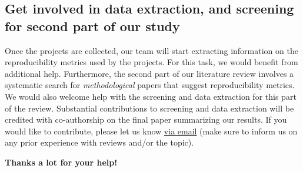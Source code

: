 \documentclass[a4paper,10.5pt]{report}
\begin{document}
\subsection*{Get involved in data extraction, and screening for second part of our study}
Once the projects are collected, our team will start extracting information on the reproducibility metrics used by the projects. For this task, we would benefit from additional help. Furthermore, the second part of our literature review involves a systematic search for \textit{methodological} papers that suggest reproducibility metrics. We would also welcome help with the screening and data extraction for this part of the review. Substantial contributions to screening and data extraction will be credited with co-authorship on the final paper summarizing our results. If you would like to contribute, please let us know \href{mailto:rachel.heyard@uzh.ch}{via email} (make sure to inform us on any prior experience with reviews and/or the topic).


\begin{center}
\textbf{\Large \textcolor{iRISEblue}{Thanks a lot for your help!}}
\end{center}
\end{document}
